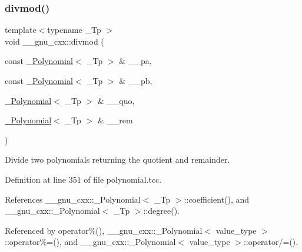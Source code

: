 \subsubsection{\texorpdfstring{divmod()}{divmod()}}
{\footnotesize\ttfamily template$<$typename \+\_\+\+Tp $>$ \\
void \+\_\+\+\_\+gnu\+\_\+cxx\+::divmod (\begin{DoxyParamCaption}\item[{const \hyperlink{class____gnu__cxx_1_1__Polynomial}{\+\_\+\+Polynomial}$<$ \+\_\+\+Tp $>$ \&}]{\+\_\+\+\_\+pa,  }\item[{const \hyperlink{class____gnu__cxx_1_1__Polynomial}{\+\_\+\+Polynomial}$<$ \+\_\+\+Tp $>$ \&}]{\+\_\+\+\_\+pb,  }\item[{\hyperlink{class____gnu__cxx_1_1__Polynomial}{\+\_\+\+Polynomial}$<$ \+\_\+\+Tp $>$ \&}]{\+\_\+\+\_\+quo,  }\item[{\hyperlink{class____gnu__cxx_1_1__Polynomial}{\+\_\+\+Polynomial}$<$ \+\_\+\+Tp $>$ \&}]{\+\_\+\+\_\+rem }\end{DoxyParamCaption})}

Divide two polynomials returning the quotient and remainder. 

Definition at line 351 of file polynomial.\+tcc.



References \+\_\+\+\_\+gnu\+\_\+cxx\+::\+\_\+\+Polynomial$<$ \+\_\+\+Tp $>$\+::coefficient(), and \+\_\+\+\_\+gnu\+\_\+cxx\+::\+\_\+\+Polynomial$<$ \+\_\+\+Tp $>$\+::degree().



Referenced by operator\%(), \+\_\+\+\_\+gnu\+\_\+cxx\+::\+\_\+\+Polynomial$<$ value\+\_\+type $>$\+::operator\%=(), and \+\_\+\+\_\+gnu\+\_\+cxx\+::\+\_\+\+Polynomial$<$ value\+\_\+type $>$\+::operator/=().


